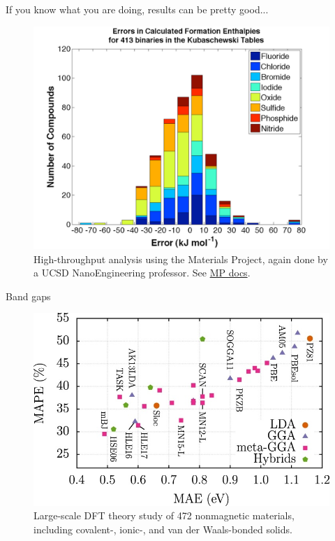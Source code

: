 \documentclass[aspectratio=169]{beamer}
\begin{document}
\begin{frame}{If you know what you are doing, results can be pretty good...}
\begin{figure}
    \centering
    \includegraphics[width=0.5\linewidth]{lectures/figures/6_formation_energies_stats.png}
    \caption{High-throughput analysis using the Materials Project, again done by a UCSD NanoEngineering professor. See \href{https://docs.materialsproject.org/methodology/materials-methodology/thermodynamic-stability/thermodynamic-stability/anion-and-gga-gga+u-mixing}{MP docs}.}
    \end{figure}
\end{frame} 

\begin{frame}{Band gaps}
\begin{figure}
    \centering
    \includegraphics[width=0.55\linewidth]{lectures/figures/6_bandgaps.jpeg}
    \caption{Large-scale DFT theory study of 472 nonmagnetic materials, including covalent-, ionic-, and van der Waals-bonded solids.\cite{borlidoExchangecorrelationFunctionalsBand2020}}
    \end{figure}
\end{frame} 
\end{document}

